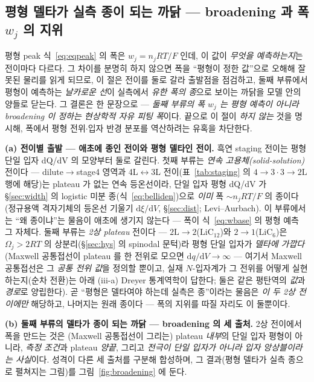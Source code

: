 \documentclass[11pt,a4paper]{article}
\newcommand{\dd}{\mathrm{d}}
\begin{document}
\subsection{평형 델타가 실측 종이 되는 까닭 — broadening 과 폭 $w_j$ 의 지위}\label{sec:broadening}
평형 peak 식~\eqref{eq:eqpeak} 의 폭은 $w_j=n_jRT/F$ 인데, 이 값이 \emph{무엇을 예측하는지}는 전이마다 다르다.
그 차이를 분명히 하지 않으면 폭을 ``평형이 정한 값''으로 오해해 잘못된 물리를 읽게 되므로, 이 절은 전이를 둘로 갈라
출발점을 점검하고, 둘째 부류에서 평형이 예측하는 \emph{날카로운 선}이 실측에서 \emph{유한 폭의 종}으로 보이는 까닭을
모델 안의 양들로 닫는다. 그 결론은 한 문장으로 — \emph{둘째 부류의 폭 $w_j$ 는 평형 예측이 아니라 broadening 이 정하는
현상학적 자유 피팅 폭}이다. 끝으로 이 절이 \emph{하지 않는} 것을 명시해, 폭에서 평형 전위$\cdot$입자 반경 분포를
역산하려는 유혹을 차단한다.

\textbf{(a) 전이별 출발 — 애초에 종인 전이와 평형 델타인 전이.} 흑연 staging 전이는 평형 단일 입자 dQ/dV 의 모양부터
둘로 갈린다. 첫째 부류는 \emph{연속 고용체(solid-solution)} 전이다 — dilute$\to$stage4 영역과 4L$\leftrightarrow$3L
전이(표~\ref{tab:staging} 의 $4\!\to\!3\cdot3\!\to\!2\mathrm L$ 행에 해당)는 plateau 가 없는 연속 등온선이라\cite{rsc2021}, 단일 입자 평형 dQ/dV 가 \S\ref{sec:width} 의 logistic 미분
종(식~\eqref{eq:belliden})으로 \emph{이미} 폭 $\sim n_jRT/F$ 의 종이다(정규용액 격자기체의 등온선 기울기
$\dd\xi/\dd V$, \S\ref{sec:dist}; Levi--Aurbach\cite{leviaurbach1999}). 이 부류에서는 ``왜 종이냐''는 물음이 애초에
생기지 않는다 — 폭이 식~\eqref{eq:wbase} 의 평형 예측 그 자체다. 둘째 부류는 \emph{2상 plateau} 전이다 —
$2\mathrm L\!\to\!2$($\mathrm{LiC_{12}}$)와 $2\!\to\!1$($\mathrm{LiC_6}$)은 $\Omega_j>2RT$ 의 상분리(\S\ref{sec:hys}
의 spinodal 문턱)라 평형 단일 입자가 \emph{델타에 가깝다}(Maxwell 공통접선이 plateau 를 한 전위로 모으면
$\dd q/\dd V\!\to\!\infty$ — 여기서 Maxwell 공통접선은 그 \emph{공통 전위 값}을 정의할 뿐이고, 실재 $N$-입자계가
그 전위를 어떻게 실현하는지(순차 전환)는 아래 (iii-a) Dreyer 통계역학이 답한다; 둘은 같은 평탄역의 \emph{값}과
\emph{경로}로 양립한다). 곧 ``평형은 델타여야 하는데 실측은 종''이라는 물음은 \emph{이 두 2상 전이에만} 해당하고,
나머지는 원래 종이다 — 폭의 지위를 따질 자리도 이 둘뿐이다.

\textbf{(b) 둘째 부류의 델타가 종이 되는 까닭 — broadening 의 세 출처.} 2상 전이에서 폭을 만드는 것은 (Maxwell
공통접선이 그리는) plateau \emph{내부}의 단일 입자 평형이 아니라, \emph{측정 조건}과 plateau \emph{양끝}, 그리고
\emph{전극이 단일 입자가 아니라 입자 앙상블이라는 사실}이다. 성격이 다른 세 출처를 구분해 합성하며, 그 결과(평형 델타가
실측 종으로 펼쳐지는 그림)를 그림~\ref{fig:broadening} 에 둔다.
\end{document}
